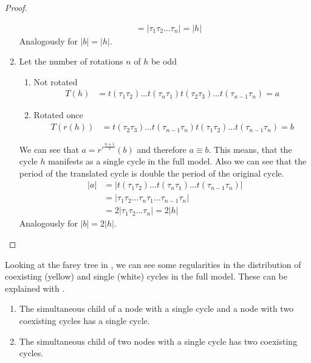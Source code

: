 \begin{proof}
\begin{enumerate}
\begin{align*}
			          & = |\tau_1\tau_2 \dots \tau_n| = |h|
		      \end{align*}
		      Analogously for $|b| = |h|$.
		\item Let the number of rotations $n$ of $h$ be odd
		      \begin{enumerate}[label=\alph*)]
			      \item Not rotated
			            \begin{align*}
				            T(h) & = t(\tau_1\tau_2) \dots t(\tau_{n}\tau_1) t(\tau_2\tau_3) \dots t(\tau_{n-1}\tau_n) = a
			            \end{align*}
			      \item Rotated once
			            \begin{align*}
				            T(r(h)) & = t(\tau_2\tau_3) \dots t(\tau_{n-1}\tau_n) t(\tau_1\tau_2) \dots t(\tau_{n-1}\tau_n) = b
			            \end{align*}
		      \end{enumerate}
		      We can see that $a = r'^{\frac{n+1}{2}}(b)$ and therefore $a \equiv b$.
		      This means, that the cycle $h$ manifests as a single cycle in the full model.
		      Also we can see that the period of the translated cycle is double the period of the original cycle.
		      \begin{align*}
			      |a| & = |t(\tau_1\tau_2) \dots t(\tau_n\tau_1) \dots t(\tau_{n-1}\tau_n)| \\
			          & = |\tau_1\tau_2 \dots \tau_n\tau_1 \dots \tau_{n-1}\tau_n|          \\
			          & = 2 |\tau_1\tau_2 \dots \tau_n| = 2 |h|
		      \end{align*}
		      Analogously for $|b| = 2 |h|$.
	\end{enumerate}
\end{proof}

Looking at the farey tree in , we can see some regularities in the distribution of coexisting (yellow) and single (white) cycles in the full model.
These can be explained with .

\begin{theorem}
	\begin{enumerate}
		\item The simultaneous child of a node with a single cycle and a node with two coexisting cycles has a single cycle.
		\item The simultaneous child of two nodes with a single cycle has two coexisting cycles.
	\end{enumerate}
\end{theorem}

